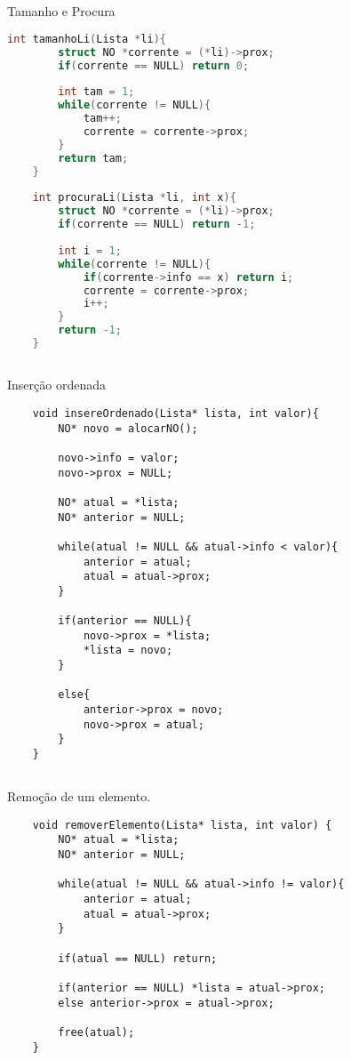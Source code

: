 \subsection{} Tamanho e Procura
\begin{lstlisting}[language=C]
	int tamanhoLi(Lista *li){
		struct NO *corrente = (*li)->prox;
		if(corrente == NULL) return 0;
		
		int tam = 1;
		while(corrente != NULL){
			tam++;
			corrente = corrente->prox;
		}
		return tam;
	}
	
	int procuraLi(Lista *li, int x){
		struct NO *corrente = (*li)->prox;
		if(corrente == NULL) return -1;
		
		int i = 1;
		while(corrente != NULL){
			if(corrente->info == x) return i;
			corrente = corrente->prox;
			i++;
		}
		return -1;
	}
\end{lstlisting}


\subsection{} Inserção ordenada

\begin{lstlisting}
	void insereOrdenado(Lista* lista, int valor){
		NO* novo = alocarNO();
		
		novo->info = valor;
		novo->prox = NULL;
		
		NO* atual = *lista;
		NO* anterior = NULL;
		
		while(atual != NULL && atual->info < valor){
			anterior = atual;
			atual = atual->prox;
		}
		
		if(anterior == NULL){
			novo->prox = *lista;
			*lista = novo;
		} 
		
		else{
			anterior->prox = novo;
			novo->prox = atual;
		}
	}
\end{lstlisting}

\subsection{} Remoção de um elemento. 
\begin{lstlisting}
	void removerElemento(Lista* lista, int valor) {
		NO* atual = *lista;
		NO* anterior = NULL;
		
		while(atual != NULL && atual->info != valor){
			anterior = atual;
			atual = atual->prox;
		}
		
		if(atual == NULL) return;
		
		if(anterior == NULL) *lista = atual->prox;
		else anterior->prox = atual->prox;
		
		free(atual);
	}
\end{lstlisting}

